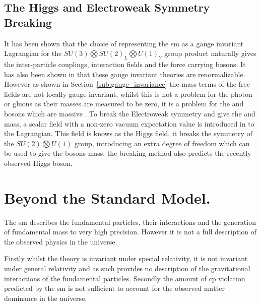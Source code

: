 \subsection{The Higgs and Electroweak Symmetry Breaking} %
\label{sub:the_higgs_and_electro_weak_symmetry_breaking}
It has been shown that the choice of representing the \ac{sm} as a gauge 
invariant Lagrangian for the $SU(3)\bigotimes SU(2)_{L} \bigotimes U(1)_{Y}$ 
group product naturally gives the inter-particle couplings, interaction fields 
and the force carrying bosons. It has also been shown in \cite{Hooft1971167} 
that these gauge invariant theories are renormalizable. However as shown in 
Section~\ref{sub:gauge_invariance} the mass terms of the free fields are not 
locally gauge invariant, whilst this is not a problem for the photon or gluons 
as their masses are measured to be zero, it is a problem for the \PW and \PZ 
bosons which are massive \cite{Arnison1983103,Aarnio1989539}. To break the 
Electroweak symmetry and give the \PW and \PZ mass, a scalar field with a 
non-zero vacuum expectation value is introduced in to the 
Lagrangian\cite{Higgs:1966cl,Higgs:1964eu}. This field is knows as the Higgs 
field, it breaks the symmetry of the $SU(2)\bigotimes U(1)$ group, introducing 
an extra degree of freedom which can be used to give the bosons mass, the 
breaking method also predicts the recently observed 
\cite{Chatrchyan201230,Aad20121} Higgs boson.



\section{Beyond the Standard Model.} %
\label{sec:beyond_the_standard_mode_}
The \ac{sm} describes the fundamental particles, their 
interactions and the generation of fundamental mass to very high precision. 
 However it is not a full description of the observed physics in the universe.

Firstly whilst the theory is invariant under special relativity, it is not 
invariant under general relativity and as such provides no description of the 
gravitational interactions of the fundamental particles. 
Secondly the amount of \ac{cp} violation predicted by the \ac{sm} is not 
sufficient to account for the observed matter dominance in the universe.

